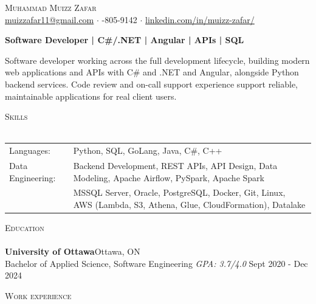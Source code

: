 \documentclass[a4paper]{article}
\newcommand{\lineunder} {
    \vspace*{-8pt} \\
    \hspace*{-18pt} \hrulefill \\
}
\newcommand{\header} [1] {
    {\hspace*{-18pt}\vspace*{6pt} \textsc{#1}}
    \vspace*{-6pt} \lineunder
}
\begin{document}
\vspace*{-40pt}

\vspace*{-10pt}
\begin{center}
	{\Huge \scshape {Muhammad Muizz Zafar}}\\
	\faSend \space \href{mailto:muizzafar11@gmail.com}{muizzafar11@gmail.com} $\cdot$ \faPhoneSquare {}-805-9142 $\cdot$ \faLinkedinSquare \space \href{https://www.linkedin.com/in/muizz-zafar/}{linkedin.com/in/muizz-zafar/}
	\\
\end{center}

\vspace{-5pt}
\begin{center}
\textbf{Software Developer | C\#/.NET | Angular | APIs | SQL}
\end{center}
\begin{center}
Software developer working across the full development lifecycle, building modern web applications and APIs with C\# and .NET and Angular, alongside Python backend services. Code review and on-call support experience support reliable, maintainable applications for real client users.
\end{center}

\header{Skills}
\begin{tabular}{ l l }
	Languages: 
& Python, SQL, GoLang, Java, C\#, C++ \\

Data Engineering: 
& Backend Development, REST APIs, API Design, Data Modeling, Apache Airflow, PySpark, Apache Spark\\
& MSSQL Server, Oracle, PostgreSQL, Docker, Git, Linux, AWS (Lambda, S3, Athena, Glue, CloudFormation), Datalake

\end{tabular}

\header{Education}
\textbf{University of Ottawa}\hfill Ottawa, ON\\
Bachelor of Applied Science, Software Engineering \textit{GPA: 3.7/4.0} \hfill Sept 2020 - Dec 2024\\
\vspace{2mm}

\header{Work experience}
\vspace{1.5mm}
\end{document}
